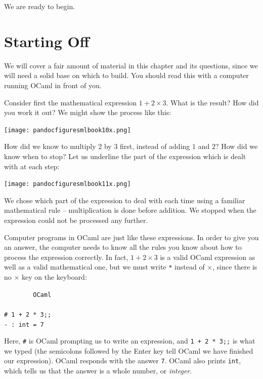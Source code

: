 \documentclass[]{book}
\newcommand{\smspace}{\vspace{4mm}}
\begin{document}
\noindent We are ready to begin.

\mainmatter

\pagestyle{fancy}
\chapter{Starting Off}
We will cover a fair amount of material in this chapter and its questions, since we will need a solid base on which to build. You should read this with a computer running OCaml in front of you.

Consider first the mathematical  expression $1 + 2 \times 3$. What is the result? How did you work it out? We might show the process like this:

\medskip
\begin{center}
\noindent\texttt{[image: pandocfiguresmlbook10x.png]}
\end{center}
\medskip

\noindent How did we know to multiply $2$ by $3$ first, instead of adding $1$ and $2$?
How did we know when to stop? Let us underline the part of the expression which is dealt with at each step:

\medskip
\begin{center}
\noindent\texttt{[image: pandocfiguresmlbook11x.png]}
\end{center}
\medskip

\noindent We chose which part of the expression to deal with each time using a familiar
mathematical rule -- multiplication is done before addition. We stopped when the
expression could not be processed any further.

Computer programs in OCaml are just like these expressions. In order to give
you an answer, the computer needs to know all the rules you know about how to
process the expression correctly.  In fact, $1 + 2 \times 3$ is a valid OCaml
expression as well as a valid mathematical one, but we must write \verb!*! instead
of $\times$, since there is no $\times$ key on the keyboard: 

\smspace
\noindent\verb!        OCaml!\\
\noindent\\
\noindent\verb!# 1 + 2 * 3;;!\\
\noindent\verb!- : int = 7!
\smspace

\noindent Here, \verb!#! is OCaml prompting us to write an expression, and
\texttt{1 + 2 * 3;;} is what we typed (the semicolons followed by the Enter
key tell OCaml we have finished our expression). OCaml responds with the answer
\verb!7!. OCaml also prints \verb!int!, which tells us that the answer is a
whole number, or \textit{integer}.
\end{document}
